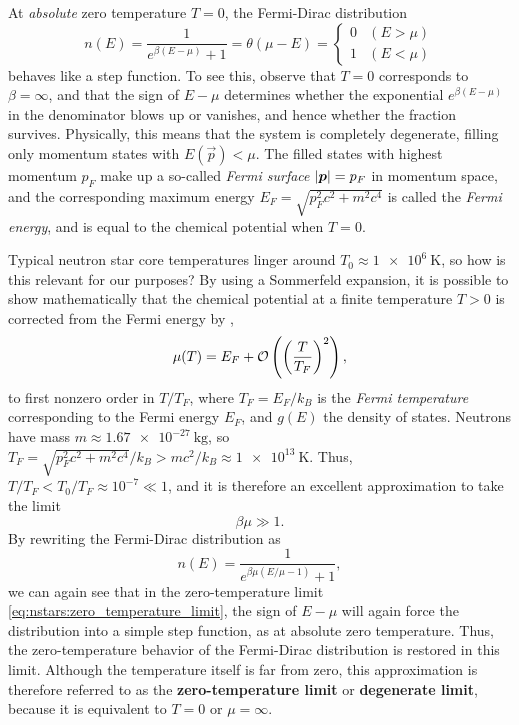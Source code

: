 At \emph{absolute} zero temperature $T = 0$, the Fermi-Dirac distribution
\begin{equation}
	n(E) = \frac{1}{e^{\beta (E - \mu)} + 1} = \theta(\mu-E) = \begin{cases} 0 & (E > \mu) \\ 1 & (E < \mu) \end{cases}
\end{equation}
behaves like a step function.
To see this, observe that $T = 0$ corresponds to $\beta = \infty$, and that the sign of $E - \mu$ determines whether the exponential $e^{\beta (E - \mu)}$ in the denominator blows up or vanishes, and hence whether the fraction survives.
Physically, this means that the system is completely degenerate, filling only momentum states with $E(\vec{p}) < \mu$.
The filled states with highest momentum $p_F$ make up a so-called \emph{Fermi surface} $\left\lvert {\bm{p}} \right\rvert = p_F$ in momentum space, and the corresponding maximum energy $E_F = \sqrt{p_F^2 c^2 + m^2 c^4}$ is called the \emph{Fermi energy}, and is equal to the chemical potential when $T = 0$.

Typical neutron star core temperatures linger around $T_0 \approx \SI{1e6}{\kelvin}$, \cite{ref:glendenning} so how is this relevant for our purposes?
By using a Sommerfeld expansion, it is possible to show mathematically that the chemical potential at a finite temperature $T > 0$ is corrected from the Fermi energy by
\cite[section 3.6]{ref:notes_statistical_physics_tong}, \cite[exercise 2]{ref:eth_statistical_physics_exercise}
\begin{equation}
	\mu(T) = E_F + \mathcal{O} \left( \left( \frac{T}{T_F} \right)^2 \right) ,
\end{equation}
to first nonzero order in $T/T_F$, where $T_F = E_F / k_B$ is the \emph{Fermi temperature} corresponding to the Fermi energy $E_F$, and $g(E)$ the density of states.
Neutrons have mass $m \approx \SI{1.67e-27}{\kilogram}$, so $T_F = \sqrt{p_F^2 c^2 + m^2 c^4} / k_B > m c^2 / k_B \approx \SI{1e13}{\kelvin}$.
Thus, $T / T_F < T_0 / T_F \approx 10^{-7} \ll 1$, and it is therefore an excellent approximation to take the limit
\begin{equation}
	\beta \mu \gg 1 .
\end{equation}
By rewriting the Fermi-Dirac distribution as
\begin{equation}
	n(E) = \frac{1}{e^{\beta \mu (E/\mu - 1)} + 1} ,
\label{eq:nstars:zero_temperature_limit}
\end{equation}
we can again see that in the zero-temperature limit \eqref{eq:nstars:zero_temperature_limit}, the sign of $E - \mu$ will again force the distribution into a simple step function, as at absolute zero temperature.
Thus, the zero-temperature behavior of the Fermi-Dirac distribution is restored in this limit.
Although the temperature itself is far from zero, this approximation is therefore referred to as the \textbf{zero-temperature limit} or \textbf{degenerate limit}, because it is equivalent to $T = 0$ or $\mu = \infty$.

